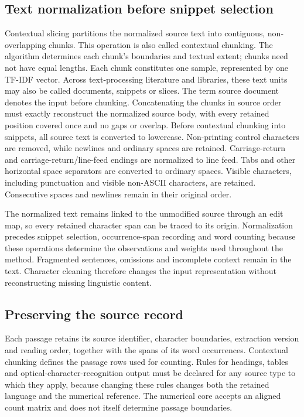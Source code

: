 \documentclass[10pt,letterpaper]{article}
\begin{document}
\subsection{Text normalization before snippet selection}
Contextual slicing partitions the normalized source text into contiguous, non-overlapping chunks. This operation is also called contextual chunking. The algorithm determines each chunk's boundaries and textual extent; chunks need not have equal lengths. Each chunk constitutes one sample, represented by one TF-IDF vector. Across text-processing literature and libraries, these text units may also be called documents, snippets or slices. The term source document denotes the input before chunking. Concatenating the chunks in source order must exactly reconstruct the normalized source body, with every retained position covered once and no gaps or overlap. Before contextual chunking into snippets, all source text is converted to lowercase. Non-printing control characters are removed, while newlines and ordinary spaces are retained. Carriage-return and carriage-return/line-feed endings are normalized to line feed. Tabs and other horizontal space separators are converted to ordinary spaces. Visible characters, including punctuation and visible non-ASCII characters, are retained. Consecutive spaces and newlines remain in their original order.\par

The normalized text remains linked to the unmodified source through an edit map, so every retained character span can be traced to its origin. Normalization precedes snippet selection, occurrence-span recording and word counting because these operations determine the observations and weights used throughout the method. Fragmented sentences, omissions and incomplete context remain in the text. Character cleaning therefore changes the input representation without reconstructing missing linguistic content.\par

\subsection{Preserving the source record}
Each passage retains its source identifier, character boundaries, extraction version and reading order, together with the spans of its word occurrences. Contextual chunking defines the passage rows used for counting. Rules for headings, tables and optical-character-recognition output must be declared for any source type to which they apply, because changing these rules changes both the retained language and the numerical reference. The numerical core accepts an aligned count matrix and does not itself determine passage boundaries.\par
\end{document}
